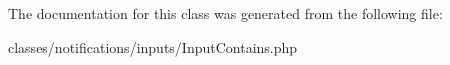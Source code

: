 

The documentation for this class was generated from the following file\+:\begin{DoxyCompactItemize}
\item 
classes/notifications/inputs/Input\+Contains.\+php\end{DoxyCompactItemize}
